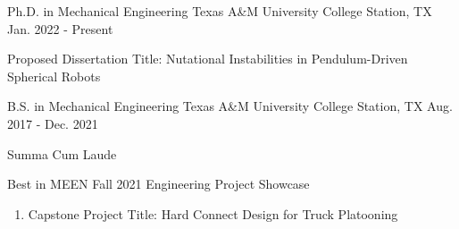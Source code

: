 


\begin{cventries}

\cventry
{Ph.D. in Mechanical Engineering} %
{Texas A\&M University} %
{College Station, TX} %
{Jan. 2022 - Present} %
{ %
\begin{cvitems}
\item {Proposed Dissertation Title: Nutational Instabilities in Pendulum-Driven Spherical Robots}
\end{cvitems}
}


\cventry
{B.S. in Mechanical Engineering} %
{Texas A\&M University} %
{College Station, TX} %
{Aug. 2017 - Dec. 2021} %
{ %
\begin{cvitems}
\item {Summa Cum Laude}
\item{Best in MEEN Fall 2021 Engineering Project Showcase}
\begin{enumerate}
    \item Capstone Project Title: Hard Connect Design for Truck Platooning
\end{enumerate}
\end{cvitems}
}


\end{cventries}